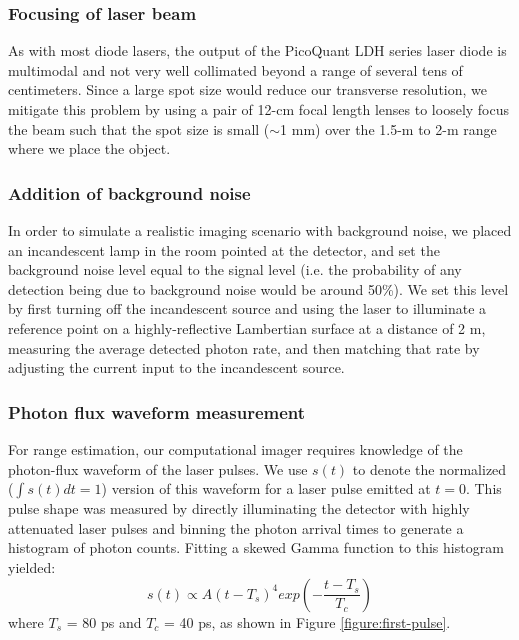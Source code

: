 \subsubsection{Focusing of laser beam}
As with most diode lasers, the output of the PicoQuant LDH series laser diode is multimodal and not very well collimated beyond a range of several tens of centimeters. Since a large spot size would reduce our transverse resolution, we mitigate this problem by using a pair of 12-cm focal length lenses to loosely focus the beam such that the spot size is small ($\sim$1 mm) over the 1.5-m to 2-m range where we place the object.

\subsubsection{Addition of background noise}
In order to simulate a realistic imaging scenario with background noise, we placed an incandescent lamp in the room pointed at the detector, and set the background noise level equal to the signal level (i.e. the probability of any detection being due to background noise would be around 50\%). We set this level by first turning off the incandescent source and using the laser to illuminate a reference point on a highly-reflective Lambertian surface at a distance of 2 m, measuring the average detected photon rate, and then matching that rate by adjusting the current input to the incandescent source.

\subsubsection{Photon flux waveform measurement}
For range estimation, our computational imager requires knowledge of the photon-flux waveform of the laser pulses. We use $s(t)$ to denote the normalized ($\int s(t) dt = 1$) version of this
waveform for a laser pulse emitted at $t = 0$. This pulse shape was measured by directly
illuminating the detector with highly attenuated laser pulses and binning the photon arrival times
to generate a histogram of photon counts. Fitting a skewed Gamma function to this histogram
yielded:
\begin{equation}
s(t) \propto A (t - T_s)^4 exp\left( -\frac{t-T_s}{T_c} \right)
\end{equation}
where $T_s$ = 80 ps and $T_c$ = 40 ps, as shown in Figure \ref{figure:first-pulse}.


